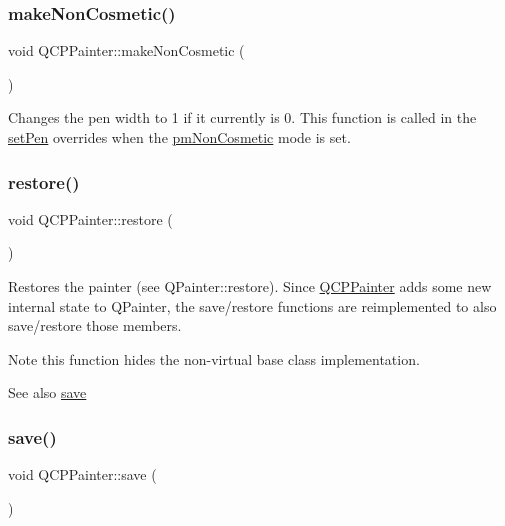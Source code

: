 \subsubsection{\texorpdfstring{make\+Non\+Cosmetic()}{makeNonCosmetic()}}
{\footnotesize\ttfamily void Q\+C\+P\+Painter\+::make\+Non\+Cosmetic (\begin{DoxyParamCaption}{ }\end{DoxyParamCaption})}

Changes the pen width to 1 if it currently is 0. This function is called in the \hyperlink{class_q_c_p_painter_af9c7a4cd1791403901f8c5b82a150195}{set\+Pen} overrides when the \hyperlink{class_q_c_p_painter_a156cf16444ff5e0d81a73c615fdb156dac1e481bfaf408f2bd2eaad3ec341f36b}{pm\+Non\+Cosmetic} mode is set. \hypertarget{class_q_c_p_painter_a64908e6298d5bbd83457dc987cc3a022}{}\label{class_q_c_p_painter_a64908e6298d5bbd83457dc987cc3a022} 
\subsubsection{\texorpdfstring{restore()}{restore()}}
{\footnotesize\ttfamily void Q\+C\+P\+Painter\+::restore (\begin{DoxyParamCaption}{ }\end{DoxyParamCaption})}

Restores the painter (see Q\+Painter\+::restore). Since \hyperlink{class_q_c_p_painter}{Q\+C\+P\+Painter} adds some new internal state to Q\+Painter, the save/restore functions are reimplemented to also save/restore those members.

\begin{DoxyNote}{Note}
this function hides the non-\/virtual base class implementation.
\end{DoxyNote}
\begin{DoxySeeAlso}{See also}
\hyperlink{class_q_c_p_painter_a8fd6821ee6fecbfa04444c9062912abd}{save} 
\end{DoxySeeAlso}
\hypertarget{class_q_c_p_painter_a8fd6821ee6fecbfa04444c9062912abd}{}\label{class_q_c_p_painter_a8fd6821ee6fecbfa04444c9062912abd} 
\subsubsection{\texorpdfstring{save()}{save()}}
{\footnotesize\ttfamily void Q\+C\+P\+Painter\+::save (\begin{DoxyParamCaption}{ }\end{DoxyParamCaption})}


